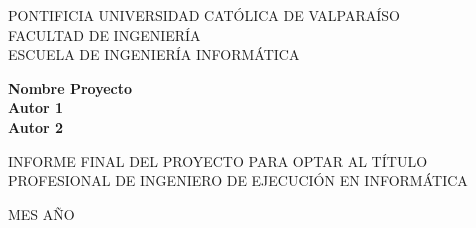 
\begin{center}
\large{PONTIFICIA UNIVERSIDAD CATÓLICA DE VALPARAÍSO\\FACULTAD DE INGENIERÍA\\ESCUELA DE INGENIERÍA INFORMÁTICA}
\end{center}

\vskip 1in

\begin{center}
\Large{\textbf{Nombre Proyecto}}
\vskip 0.4in
\Large{\textbf{\\Autor 1\\}}
\vskip 0.2in
\Large{\textbf{Autor 2\\}}
\end{center}

\hfill

\vskip 1.5in
\begin{flushright}
	\parbox[t]{3.3in}{
		\large{
			INFORME FINAL DEL PROYECTO
			PARA OPTAR AL TÍTULO PROFESIONAL DE
			INGENIERO DE EJECUCIÓN EN INFORMÁTICA
		}
	}
\end{flushright}
\vskip 2in
\begin{center} \large{MES AÑO} \end{center}

\pagestyle{empty}


